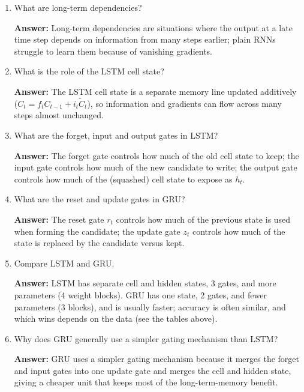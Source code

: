 \documentclass[10pt]{article}
\begin{document}
\begin{enumerate}
\textbf{Answer:} Gradients can explode if the norm of those Jacobians is
above 1 (large $W_h$), causing the product to grow exponentially, which
leads to huge updates and unstable training; gradient clipping is the usual
remedy.

\item What are long-term dependencies?

\textbf{Answer:} Long-term dependencies are situations where the output at
a late time step depends on information from many steps earlier; plain
RNNs struggle to learn them because of vanishing gradients.

\item What is the role of the LSTM cell state?

\textbf{Answer:} The LSTM cell state is a separate memory line updated
additively ($C_t=f_tC_{t-1}+i_t\tilde{C}_t$), so information and gradients
can flow across many steps almost unchanged.

\item What are the forget, input and output gates in LSTM?

\textbf{Answer:} The forget gate controls how much of the old cell state to
keep; the input gate controls how much of the new candidate to write; the
output gate controls how much of the (squashed) cell state to expose as
$h_t$.

\item What are the reset and update gates in GRU?

\textbf{Answer:} The reset gate $r_t$ controls how much of the previous
state is used when forming the candidate; the update gate $z_t$ controls
how much of the state is replaced by the candidate versus kept.

\item Compare LSTM and GRU.

\textbf{Answer:} LSTM has separate cell and hidden states, 3 gates, and
more parameters (4 weight blocks). GRU has one state, 2 gates, and fewer
parameters (3 blocks), and is usually faster; accuracy is often similar,
and which wins depends on the data (see the tables above).

\item Why does GRU generally use a simpler gating mechanism than LSTM?

\textbf{Answer:} GRU uses a simpler gating mechanism because it merges the
forget and input gates into one update gate and merges the cell and hidden
state, giving a cheaper unit that keeps most of the long-term-memory
benefit.


\end{enumerate}
\end{document}
